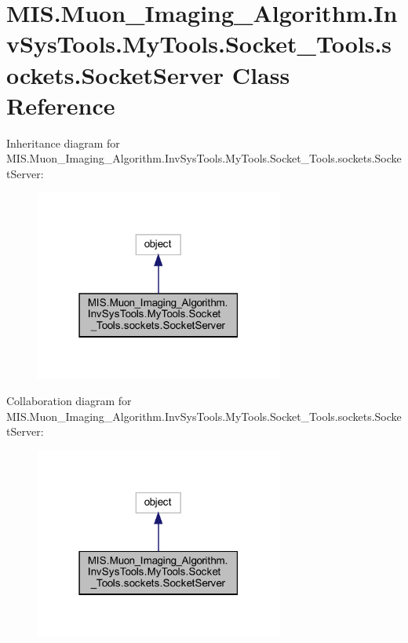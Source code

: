 \hypertarget{classMIS_1_1Muon__Imaging__Algorithm_1_1InvSysTools_1_1MyTools_1_1Socket__Tools_1_1sockets_1_1SocketServer}{}\section{M\+I\+S.\+Muon\+\_\+\+Imaging\+\_\+\+Algorithm.\+Inv\+Sys\+Tools.\+My\+Tools.\+Socket\+\_\+\+Tools.\+sockets.\+Socket\+Server Class Reference}
\label{classMIS_1_1Muon__Imaging__Algorithm_1_1InvSysTools_1_1MyTools_1_1Socket__Tools_1_1sockets_1_1SocketServer}


Inheritance diagram for M\+I\+S.\+Muon\+\_\+\+Imaging\+\_\+\+Algorithm.\+Inv\+Sys\+Tools.\+My\+Tools.\+Socket\+\_\+\+Tools.\+sockets.\+Socket\+Server\+:
\nopagebreak
\begin{figure}[H]
\begin{center}
\leavevmode
\includegraphics[width=231pt]{classMIS_1_1Muon__Imaging__Algorithm_1_1InvSysTools_1_1MyTools_1_1Socket__Tools_1_1sockets_1_1SocketServer__inherit__graph}
\end{center}
\end{figure}


Collaboration diagram for M\+I\+S.\+Muon\+\_\+\+Imaging\+\_\+\+Algorithm.\+Inv\+Sys\+Tools.\+My\+Tools.\+Socket\+\_\+\+Tools.\+sockets.\+Socket\+Server\+:
\nopagebreak
\begin{figure}[H]
\begin{center}
\leavevmode
\includegraphics[width=231pt]{classMIS_1_1Muon__Imaging__Algorithm_1_1InvSysTools_1_1MyTools_1_1Socket__Tools_1_1sockets_1_1SocketServer__coll__graph}
\end{center}
\end{figure}
